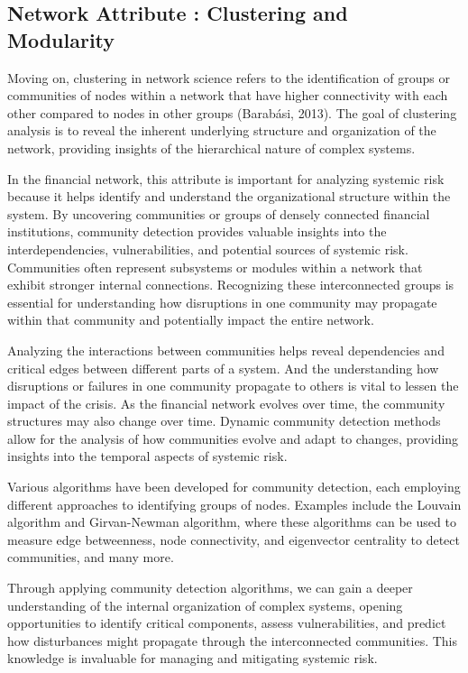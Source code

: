\documentclass[a4paper,11pt]{article}
\begin{document}
\subsection{Network Attribute : Clustering and Modularity}
Moving on, clustering in network science refers to the identification of groups or communities of nodes within a network that have higher connectivity with each other compared to nodes in other groups (Barabási, 2013). The goal of clustering analysis is to reveal the inherent underlying structure and organization of the network, providing insights of the hierarchical nature of complex systems. 

In the financial network, this attribute is important for analyzing systemic risk because it helps identify and understand the organizational structure within the system. By uncovering communities or groups of densely connected financial institutions, community detection provides valuable insights into the interdependencies, vulnerabilities, and potential sources of systemic risk. Communities often represent subsystems or modules within a network that exhibit stronger internal connections. Recognizing these interconnected groups is essential for understanding how disruptions in one community may propagate within that community and potentially impact the entire network.

Analyzing the interactions between communities helps reveal dependencies and critical edges between different parts of a system. And the understanding how disruptions or failures in one community propagate to others is vital to lessen the impact of the crisis. As the financial network evolves over time, the community structures may also change over time. Dynamic community detection methods allow for the analysis of how communities evolve and adapt to changes, providing insights into the temporal aspects of systemic risk.

Various algorithms have been developed for community detection, each employing different approaches to identifying groups of nodes. Examples include the Louvain algorithm and Girvan-Newman algorithm, where these algorithms can be used to measure edge betweenness, node connectivity, and eigenvector centrality to detect communities, and many more.

Through applying community detection algorithms, we can gain a deeper understanding of the internal organization of complex systems, opening opportunities to identify critical components, assess vulnerabilities, and predict how disturbances might propagate through the interconnected communities. This knowledge is invaluable for managing and mitigating systemic risk.
\end{document}
